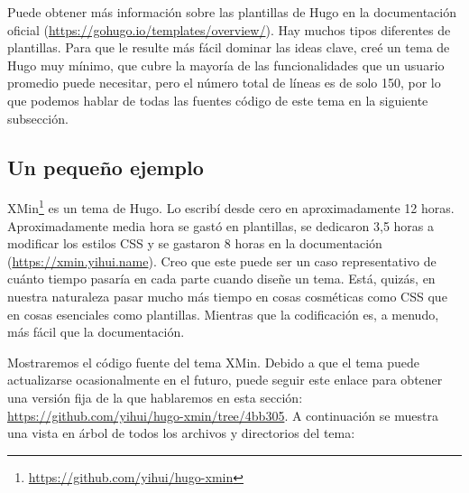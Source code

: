 \documentclass[12pt,]{krantz}
\renewcommand{\href}[2]{#2\footnote{\url{#1}}}
\theoremstyle{definition}
\theoremstyle{definition}
\theoremstyle{definition}
\theoremstyle{remark}
\begin{document}
Puede obtener más información sobre las plantillas de Hugo en la
documentación oficial (\url{https://gohugo.io/templates/overview/}). Hay
muchos tipos diferentes de plantillas. Para que le resulte más fácil
dominar las ideas clave, creé un tema de Hugo muy mínimo, que cubre la
mayoría de las funcionalidades que un usuario promedio puede necesitar,
pero el número total de líneas es de solo 150, por lo que podemos hablar
de todas las fuentes código de este tema en la siguiente subsección.

\hypertarget{un-pequeno-ejemplo}{%
\subsection{Un pequeño ejemplo}\label{un-pequeno-ejemplo}}

\href{https://github.com/yihui/hugo-xmin}{XMin} es un tema de
Hugo. Lo escribí desde cero en aproximadamente 12
horas. Aproximadamente media hora se gastó en plantillas, se dedicaron
3,5 horas a modificar los estilos CSS y se gastaron 8 horas en la
documentación (\url{https://xmin.yihui.name}). Creo que este puede ser
un caso representativo de cuánto tiempo pasaría en cada parte cuando
diseñe un tema. Está, quizás, en nuestra naturaleza pasar mucho más
tiempo en cosas cosméticas como CSS que en cosas esenciales como
plantillas. Mientras que la codificación es, a menudo, más fácil que la
documentación.

Mostraremos el código fuente del tema XMin. Debido a que el tema puede
actualizarse ocasionalmente en el futuro, puede seguir este enlace para
obtener una versión fija de la que hablaremos en esta sección:
\url{https://github.com/yihui/hugo-xmin/tree/4bb305}. A continuación se
muestra una vista en árbol de todos los archivos y directorios del tema:
\end{document}

